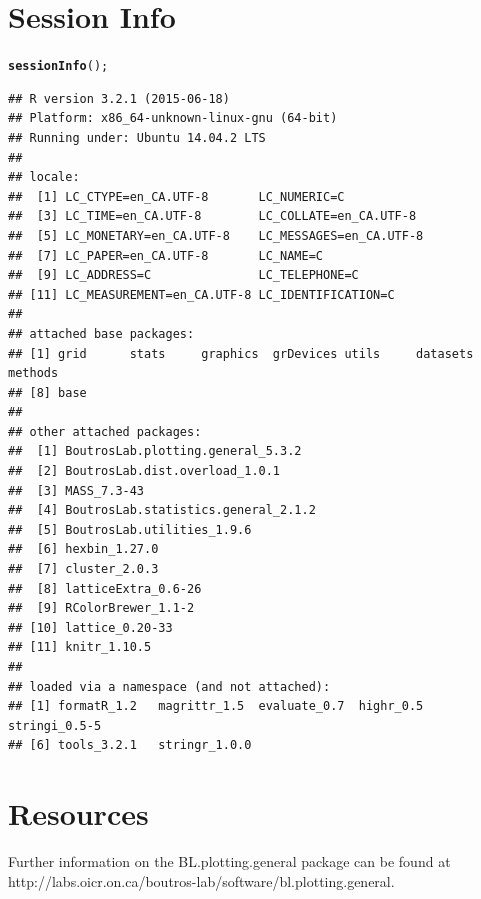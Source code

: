 \documentclass[letterpaper]{report}\usepackage[]{graphicx}\usepackage[]{color}
\makeatletter
\newcommand{\hlstd}[1]{\textcolor[rgb]{0.345,0.345,0.345}{#1}}%
\newcommand{\hlkwd}[1]{\textcolor[rgb]{0.737,0.353,0.396}{\textbf{#1}}}%
\newenvironment{kframe}{%
 \def\at@end@of@kframe{}%
 \ifinner\ifhmode%
  \def\at@end@of@kframe{\end{minipage}}%
  \begin{minipage}{\columnwidth}%
 \fi\fi%
 \def\FrameCommand##1{\hskip\@totalleftmargin \hskip-\fboxsep
 \colorbox{shadecolor}{##1}\hskip-\fboxsep
     \hskip-\linewidth \hskip-\@totalleftmargin \hskip\columnwidth}%
 \MakeFramed {\advance\hsize-\width
   \@totalleftmargin\z@ \linewidth\hsize
   \@setminipage}}%
 {\par\unskip\endMakeFramed%
 \at@end@of@kframe}
\newenvironment{knitrout}{}{} %
\makeatother
\begin{document}
\section{Session Info}
\begin{knitrout}
\color{fgcolor}\begin{kframe}
\begin{alltt}
\hlkwd{sessionInfo}\hlstd{();}
\end{alltt}
\begin{verbatim}
## R version 3.2.1 (2015-06-18)
## Platform: x86_64-unknown-linux-gnu (64-bit)
## Running under: Ubuntu 14.04.2 LTS
## 
## locale:
##  [1] LC_CTYPE=en_CA.UTF-8       LC_NUMERIC=C              
##  [3] LC_TIME=en_CA.UTF-8        LC_COLLATE=en_CA.UTF-8    
##  [5] LC_MONETARY=en_CA.UTF-8    LC_MESSAGES=en_CA.UTF-8   
##  [7] LC_PAPER=en_CA.UTF-8       LC_NAME=C                 
##  [9] LC_ADDRESS=C               LC_TELEPHONE=C            
## [11] LC_MEASUREMENT=en_CA.UTF-8 LC_IDENTIFICATION=C       
## 
## attached base packages:
## [1] grid      stats     graphics  grDevices utils     datasets  methods  
## [8] base     
## 
## other attached packages:
##  [1] BoutrosLab.plotting.general_5.3.2  
##  [2] BoutrosLab.dist.overload_1.0.1     
##  [3] MASS_7.3-43                        
##  [4] BoutrosLab.statistics.general_2.1.2
##  [5] BoutrosLab.utilities_1.9.6         
##  [6] hexbin_1.27.0                      
##  [7] cluster_2.0.3                      
##  [8] latticeExtra_0.6-26                
##  [9] RColorBrewer_1.1-2                 
## [10] lattice_0.20-33                    
## [11] knitr_1.10.5                       
## 
## loaded via a namespace (and not attached):
## [1] formatR_1.2   magrittr_1.5  evaluate_0.7  highr_0.5     stringi_0.5-5
## [6] tools_3.2.1   stringr_1.0.0
\end{verbatim}
\end{kframe}
\end{knitrout}

\section{Resources}
Further information on the BL.plotting.general package can be found at  http://labs.oicr.on.ca/boutros-lab/software/bl.plotting.general.
\end{document}
